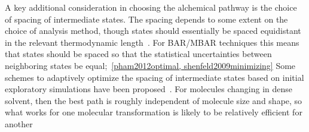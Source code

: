 \documentclass[9pt,bestpractices]{livecoms}
\begin{document}
A key additional consideration in choosing the alchemical pathway is the choice of spacing of intermediate states.
The spacing depends to some extent on the choice of analysis method, though states should essentially be spaced equidistant in the relevant thermodynamic length~\cite{crooks2007measuringa, sivak2012thermodynamic}.
For BAR/MBAR techniques this means that states should be spaced so that the statistical uncertainties between neighboring states be equal;~\ref{pham2012optimal, shenfeld2009minimizing}
Some schemes to adaptively optimize the spacing of intermediate states based on initial exploratory simulations have been proposed~\cite{hayes2017adaptive}. For molecules changing in dense solvent, then the best path is roughly independent of molecule size and shape, so what works for one molecular transformation is likely to be relatively efficient for another~\cite{monroe2004converging}
\end{document}
